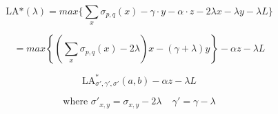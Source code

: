 \documentclass{article}
\begin{document}
\begin{equation}
\text{LA*}(\lambda) = max\lbrace\sum_x \sigma_{p,q}(x) -
\gamma\cdot y- \alpha\cdot z - 2 \lambda x -\lambda y - \lambda
L \rbrace
\end{equation}



\begin{equation}
 = max \left\lbrace \left( \sum_x \sigma_{p,q}(x) -2 \lambda\right) x -(
 \gamma +\lambda) y \right\rbrace - \alpha z  - \lambda L
\end{equation}


\begin{equation}
\text{LA}^{*}_{\sigma',\gamma',\sigma'} (a,b) - \alpha z  - \lambda L
\end{equation}

\begin{equation}
\text{where } \sigma'_{x,y} = \sigma_{x,y} - 2\lambda  \ \ \ \ \  \gamma' =
\gamma -
\lambda
\end{equation}
\end{document}
